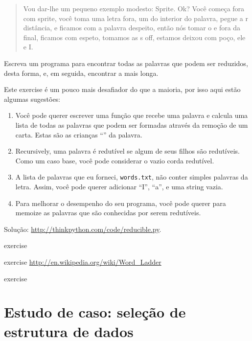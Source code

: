 \documentclass[10pt]{book}
\begin{document}
\begin{exercise}
\begin{v erbatim}
\begin{}
\begin{quote}
Vou dar-lhe um pequeno exemplo modesto: Sprite. Ok? Você começa
fora com sprite, você toma uma letra fora, um do interior do
palavra, pegue a r distância, e ficamos com a palavra despeito, então nós
tomar o e fora da final, ficamos com espeto, tomamos as s off, estamos
deixou com poço, ele e I.
\end{quote}

Escreva um programa para encontrar todas as palavras que podem ser reduzidos, desta forma,
e, em seguida, encontrar a mais longa.

Este exercise é um pouco mais desafiador do que a maioria, por isso aqui estão
algumas sugestões:

\begin{enumerate}

\item Você pode querer escrever uma função que recebe uma palavra e
  calcula uma lista de todas as palavras que podem ser formadas através da remoção de um
  carta. Estas são as crianças ``'' da palavra.

\item Recursively, uma palavra é redutível se algum de seus filhos
são redutíveis. Como um caso base, você pode considerar o vazio
corda redutível.

\item A lista de palavras que eu forneci, {\tt words.txt}, não
conter simples palavras da letra. Assim, você pode querer adicionar
``I'', ``a'', e uma string vazia.

\item Para melhorar o desempenho do seu programa, você pode querer
para memoize as palavras que são conhecidas por serem redutíveis.

\end{enumerate}

Solução: \url{http://thinkpython.com/code/reducible.py}.

\end{} exercise




\begin{} exercise
\url{http://en.wikipedia.org/wiki/Word_Ladder}
\end{} exercise




\chapter{Estudo de caso: seleção de estrutura de dados}


\end{v erbatim}
\end{exercise}
\end{document}

